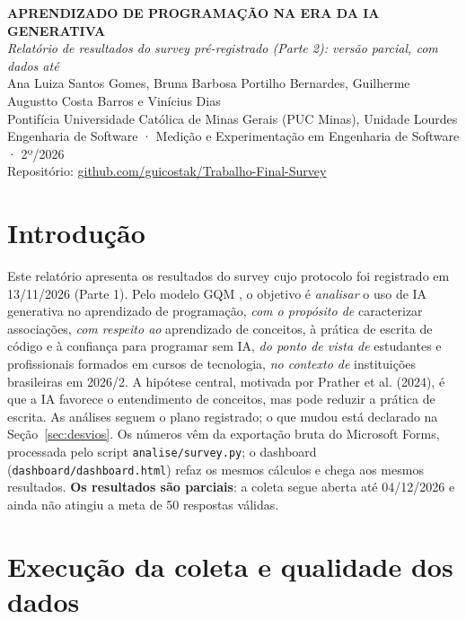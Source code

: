 \documentclass[12pt,a4paper]{article}
\begin{document}
\begin{center}
\singlespacing
{\bfseries APRENDIZADO DE PROGRAMAÇÃO NA ERA DA IA GENERATIVA}\\[0.3ex]
{\itshape Relatório de resultados do survey pré-registrado (Parte 2): versão parcial, com dados até \ultima}\\[0.8ex]
Ana Luiza Santos Gomes, Bruna Barbosa Portilho Bernardes, Guilherme Augustto Costa Barros e Vinícius Dias\\
{\small Pontifícia Universidade Católica de Minas Gerais (PUC Minas), Unidade Lourdes\\
Engenharia de Software · Medição e Experimentação em Engenharia de Software · 2º/2026\\
Repositório: \href{https://github.com/guicostak/Trabalho-Final-Survey}{github.com/guicostak/Trabalho-Final-Survey}}
\end{center}
\vspace{-1ex}

\section{Introdução}

Este relatório apresenta os resultados do survey cujo protocolo foi registrado em 13/11/2026 (Parte 1). Pelo modelo GQM \citep{basili}, o objetivo é \emph{analisar} o uso de IA generativa no aprendizado de programação, \emph{com o propósito de} caracterizar associações, \emph{com respeito ao} aprendizado de conceitos, à prática de escrita de código e à confiança para programar sem IA, \emph{do ponto de vista de} estudantes e profissionais formados em cursos de tecnologia, \emph{no contexto de} instituições brasileiras em 2026/2. A hipótese central, motivada por Prather et al. (2024), é que a IA favorece o entendimento de conceitos, mas pode reduzir a prática de escrita. As análises seguem o plano registrado; o que mudou está declarado na Seção~\ref{sec:desvios}. Os números vêm da exportação bruta do Microsoft Forms, processada pelo script \texttt{analise/survey.py}; o dashboard (\texttt{dashboard/dashboard.html}) refaz os mesmos cálculos e chega aos mesmos resultados. \textbf{Os resultados são parciais}: a coleta segue aberta até 04/12/2026 e ainda não atingiu a meta de 50 respostas válidas.

\section{Execução da coleta e qualidade dos dados}
\end{document}
